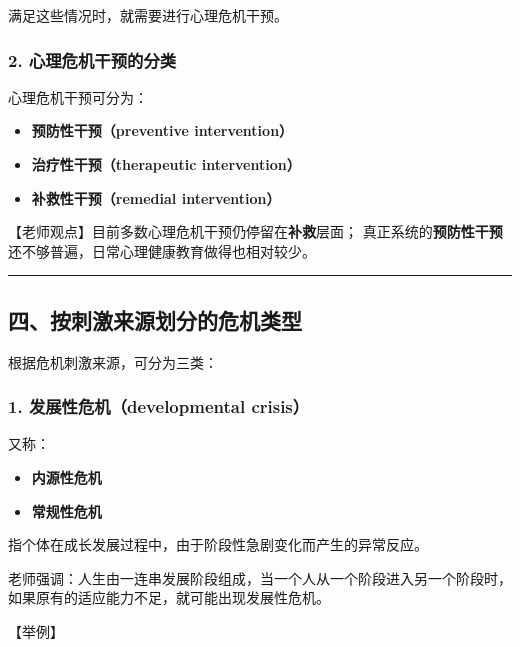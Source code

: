 \documentclass[
  chinese,
  9pt,
  a4paper,
]{ctexart}
\providecommand{\tightlist}{%
  \setlength{\itemsep}{0pt}\setlength{\parskip}{0pt}}
\begin{document}
满足这些情况时，就需要进行心理危机干预。

\subsubsection{2.
心理危机干预的分类}\label{ux5fc3ux7406ux5371ux673aux5e72ux9884ux7684ux5206ux7c7b}

心理危机干预可分为：

\begin{itemize}
\tightlist
\item
  \textbf{预防性干预（preventive intervention）}
\item
  \textbf{治疗性干预（therapeutic intervention）}
\item
  \textbf{补救性干预（remedial intervention）}
\end{itemize}

【老师观点】目前多数心理危机干预仍停留在\textbf{补救}层面；
真正系统的\textbf{预防性干预}还不够普遍，日常心理健康教育做得也相对较少。

\begin{center}\rule{0.5\linewidth}{0.5pt}\end{center}

\subsection{四、按刺激来源划分的危机类型}\label{ux56dbux6309ux523aux6fc0ux6765ux6e90ux5212ux5206ux7684ux5371ux673aux7c7bux578b}

根据危机刺激来源，可分为三类：

\subsubsection{1. 发展性危机（developmental
crisis）}\label{ux53d1ux5c55ux6027ux5371ux673adevelopmental-crisis}

又称：

\begin{itemize}
\tightlist
\item
  \textbf{内源性危机}
\item
  \textbf{常规性危机}
\end{itemize}

指个体在成长发展过程中，由于阶段性急剧变化而产生的异常反应。

老师强调：人生由一连串发展阶段组成，当一个人从一个阶段进入另一个阶段时，如果原有的适应能力不足，就可能出现发展性危机。

【举例】
\end{document}
